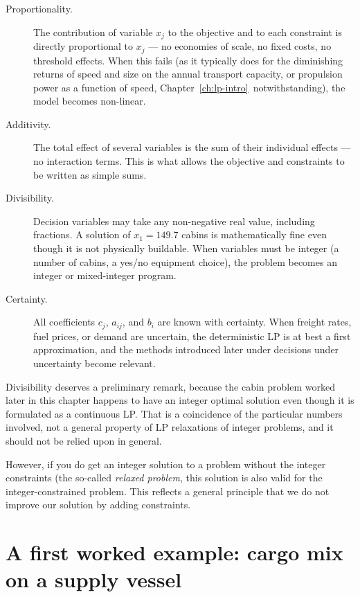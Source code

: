 \begin{description}
  \item[Proportionality.] The contribution of variable $x_j$ to the
  objective and to each constraint is directly proportional to $x_j$ — no
  economies of scale, no fixed costs, no threshold effects. When this
  fails (as it typically does for the diminishing returns of speed and size on the annual transport capacity, or propulsion power as a function of
  speed, Chapter~\ref{ch:lp-intro}\nobreak\ notwithstanding), the model
  becomes non-linear.
  \item[Additivity.] The total effect of several variables is the sum of
  their individual effects — no interaction terms. This is what allows
  the objective and constraints to be written as simple sums.
  \item[Divisibility.] Decision variables may take any non-negative real
  value, including fractions. A solution of $x_1 = 149.7$ cabins is
  mathematically fine even though it is not physically buildable. When
  variables must be integer (a number of cabins, a yes/no equipment
  choice), the problem becomes an integer or mixed-integer program.
  \item[Certainty.] All coefficients $c_j$, $a_{ij}$, and $b_i$ are known
  with certainty. When freight rates, fuel prices, or demand are
  uncertain, the deterministic LP is at best a first approximation, and
  the methods introduced later under decisions under uncertainty become
  relevant.
\end{description}

Divisibility deserves a preliminary remark, because the cabin problem
worked later in this chapter happens to have an integer optimal solution
even though it is formulated as a continuous LP. That is a coincidence of
the particular numbers involved, not a general property of LP relaxations
of integer problems, and it should not be relied upon in general.

However, if you do get an integer solution to a problem without the integer constraints (the so-called \textit{relaxed problem}, this solution is also valid for the integer-constrained problem. This reflects a general principle that we do not improve our solution by adding constraints.

\section{A first worked example: cargo mix on a supply vessel}
\label{sec:cargo-mix}

